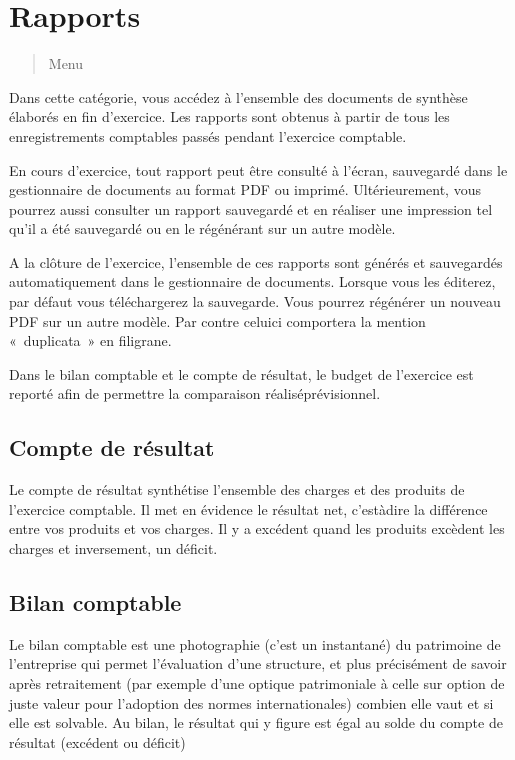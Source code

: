 \documentclass[a4paper,10pt,oneside,french]{sphinxmanual}
\begin{document}
\section{Rapports}
\label{\detokenize{accounting/reporting:rapports}}\label{\detokenize{accounting/reporting::doc}}\begin{quote}

Menu 
\end{quote}

Dans cette catégorie, vous accédez à l’ensemble des documents de synthèse élaborés en fin d’exercice. Les rapports sont obtenus à partir de tous les enregistrements comptables passés pendant l’exercice comptable.

En cours d’exercice, tout rapport peut être consulté à l’écran, sauvegardé dans le gestionnaire de documents au format PDF ou imprimé. Ultérieurement, vous pourrez aussi consulter un rapport sauvegardé et en réaliser une impression tel qu’il a été sauvegardé ou en le régénérant sur un autre modèle.

A la clôture de l’exercice, l’ensemble de ces rapports sont générés et sauvegardés automatiquement dans le gestionnaire de documents. Lorsque vous les éditerez, par défaut vous téléchargerez la sauvegarde. Vous pourrez régénérer un nouveau PDF sur un autre modèle. Par contre celui\sphinxhyphen{}ci comportera la mention « duplicata » en filigrane.

Dans le bilan comptable et le compte de résultat, le budget de l’exercice est reporté afin de permettre la comparaison réalisé\sphinxhyphen{}prévisionnel.


\subsection{Compte de résultat}
\label{\detokenize{accounting/reporting:compte-de-resultat}}
Le compte de résultat  synthétise l’ensemble des charges et des produits de l’exercice comptable.
Il met en évidence le résultat net, c’est\sphinxhyphen{}à\sphinxhyphen{}dire la différence entre vos produits et vos charges. Il y a excédent quand les produits excèdent les charges et inversement, un déficit.


\subsection{Bilan comptable}
\label{\detokenize{accounting/reporting:bilan-comptable}}
Le bilan comptable est une photographie (c’est un instantané) du patrimoine de l’entreprise qui permet l’évaluation d’une structure, et plus précisément de savoir après retraitement (par exemple d’une optique patrimoniale à celle sur option de juste valeur pour l’adoption des normes internationales) combien elle vaut et si elle est solvable.
Au bilan, le résultat qui y figure est égal au solde du compte de résultat (excédent ou déficit)
\end{document}
